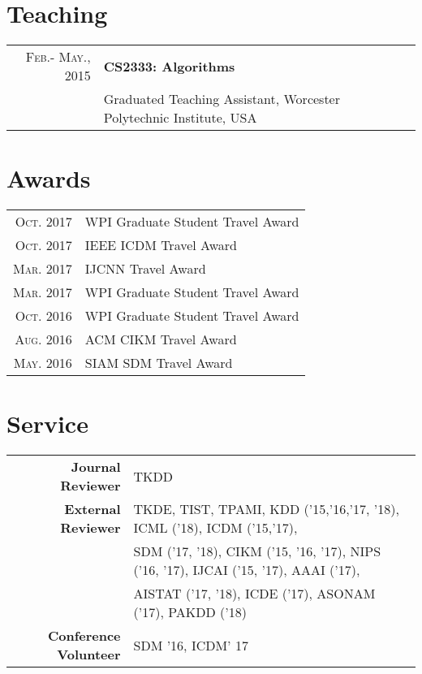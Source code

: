 \documentclass[a4paper,10pt]{article} %
\begin{document}
\section{Teaching}
\begin{tabular}{rl}	
\textsc{Feb.- May., 2015} & \textbf{CS2333: Algorithms}  \\
& Graduated Teaching Assistant, Worcester Polytechnic Institute, USA\\
\end{tabular}

\section{Awards}
\begin{tabular}{rl}
\textsc{Oct.} 2017 & WPI Graduate Student Travel Award \normalsize\\
\textsc{Oct.} 2017 & IEEE ICDM Travel Award  \normalsize \\
\textsc{Mar.} 2017 & IJCNN Travel Award \normalsize \\
\textsc{Mar.} 2017 & WPI Graduate Student Travel Award \normalsize\\
\textsc{Oct.} 2016 & WPI Graduate Student Travel Award \normalsize\\
\textsc{Aug.} 2016 & ACM CIKM Travel Award \normalsize\\
\textsc{May.} 2016 & SIAM SDM Travel Award \normalsize\\
\end{tabular}

\section{Service}
\begin{tabular}{rl}	
\textbf{Journal Reviewer} & TKDD  \\
\textbf{External Reviewer} & TKDE, TIST, TPAMI, KDD ('15,'16,'17, '18), ICML ('18), ICDM ('15,'17), \\
    & SDM ('17, '18), CIKM ('15, '16, '17), NIPS ('16, '17), IJCAI ('15, '17), AAAI ('17),\\
    & AISTAT ('17, '18), ICDE ('17), ASONAM ('17), PAKDD ('18) \\
\textbf{Conference Volunteer} & SDM '16, ICDM' 17    
\end{tabular}
\end{document}
